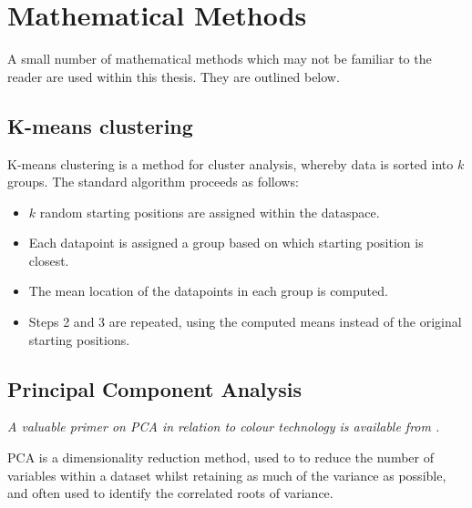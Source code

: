 \section{Mathematical Methods}

A small number of mathematical methods which may not be familiar to the reader are used within this thesis. They are outlined below.

\subsection{K-means clustering}

K-means clustering is a method for cluster analysis, whereby data is sorted into $k$ groups. The standard algorithm proceeds as follows: 

\begin{itemize}
    \item $k$ random starting positions are assigned within the dataspace. 
    \item Each datapoint is assigned a group based on which starting position is closest.
    \item The mean location of the datapoints in each group is computed.
    \item Steps 2 and 3 are repeated, using the computed means instead of the original starting positions.
\end{itemize}

\subsection{Principal Component Analysis}

\textit{A valuable primer on \gls{PCA} in relation to colour technology is available from \citet{tzeng_review_2005}.}

\Gls{PCA} is a dimensionality reduction method, used to to reduce the number of variables within a dataset whilst retaining as much of the variance as possible, and often used to identify the correlated roots of variance.

